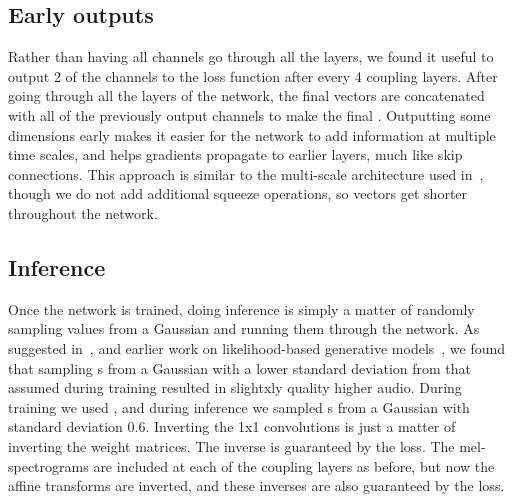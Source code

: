 \subsection{Early outputs}
Rather than having all channels go through all the layers, we found it useful to output 2 of the channels to the loss function after every 4 coupling layers.  After going through all the layers of the network, the final vectors are concatenated with all of the previously output channels to make the final .  Outputting some dimensions early makes it easier for the network to add information at multiple time scales, and helps gradients propagate to earlier layers, much like skip connections.  This approach is similar to the multi-scale architecture used in~\cite{kingma2018glow,dinh2016density}, though we do not add additional squeeze operations, so vectors get shorter throughout the network.  

\subsection{Inference}
Once the network is trained, doing inference is simply a matter of randomly sampling  values from a Gaussian and running them through the network. As suggested in~\cite{kingma2018glow}, and earlier work on likelihood-based generative models~\cite{parmar2018image}, we found that sampling s from a Gaussian with a lower standard deviation from that assumed during training resulted in slightxly quality higher audio. During training we used , and during inference we sampled s from a Gaussian with standard deviation 0.6.  Inverting the 1x1 convolutions is just a matter of inverting the weight matrices.  The inverse is guaranteed by the loss.  The mel-spectrograms are included at each of the coupling layers as before, but now the affine transforms are inverted, and these inverses are also guaranteed by the loss.
